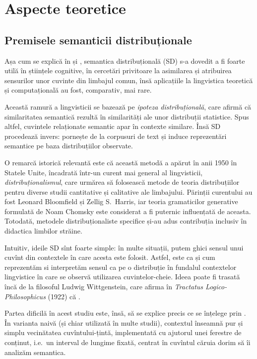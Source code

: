 \chapter{Aspecte teoretice}

\section{Premisele semanticii distribuționale}

Așa cum se explică în \cite{boleda} și \cite{boledaherbelot}, semantica
distribuțională (SD) s-a dovedit a fi foarte utilă în științele cognitive,
în cercetări privitoare la asimilarea și atribuirea sensurilor unor cuvinte
din limbajul comun, însă aplicațiile la lingvistica teoretică și computațională
au fost, comparativ, mai rare.

Această ramură a lingvisticii se bazează pe \emph{ipoteza distribuțională},
care afirmă că similaritatea semantică rezultă în similarități ale unor
distribuții statistice. Spus altfel, cuvintele relaționate semantic apar
în contexte similare. Însă SD procedează invers: pornește de la corpusuri de
text și induce reprezentări semantice pe baza distribuțiilor observate.

O remarcă istorică relevantă este că această metodă a apărut în anii 1950 în
Statele Unite, încadrată într-un curent mai general al lingvisticii,
\emph{distribuționalismul}, care urmărea să folosească metode de teoria
distribuțiilor pentru diverse studii cantitative și calitative ale limbajului.
Părinții curentului au fost Leonard Bloomfield și Zellig S.\ Harris, iar teoria
gramaticilor generative formulată de Noam Chomsky este considerat a fi puternic
influențată de aceasta. Totodată, metodele distribuționaliste specifice și-au
adus contribuția inclusiv în didactica limbilor străine.

Intuitiv, ideile SD sînt foarte simple: în multe situații, putem ghici sensul
unui cuvînt din contextele în care acesta este folosit. Astfel, este ca
și cum reprezentăm si interpretăm sensul ca pe o distribuție în fundalul
contextelor lingvistice în care se observă utilizarea cuvintelor-cheie.
Ideea poate fi trasată încă de la filosoful Ludwig Wittgenstein, care
afirma în \emph{Tractatus Logico-Philosophicus} (1922) că .

Partea dificilă în acest studiu este, însă, să se explice precis ce se
înțelege prin . În varianta naivă (și chiar utilizată în multe
studii), contextul înseamnă pur și simplu vecinătatea cuvîntului-țintă,
implementată cu ajutorul unei ferestre de conținut, i.e.\ un interval de
lungime fixată, centrat în cuvîntul căruia dorim să îi analizăm semantica.

